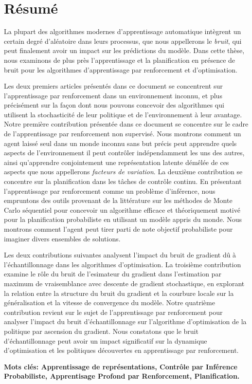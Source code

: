 \chapter*{R\'{e}sum\'{e}}
La plupart des algorithmes modernes d'apprentissage automatique intègrent un
certain degré d'aléatoire dans leurs processus, que nous appellerons le
\emph{bruit}, qui peut finalement avoir un impact sur les prédictions du modèle. Dans cette thèse, nous examinons de plus près l'apprentissage et la planification en présence de bruit pour les algorithmes d'apprentissage par renforcement et d'optimisation.

Les deux premiers articles présentés dans ce document se concentrent sur l'apprentissage par renforcement dans un environnement inconnu, et plus précisément sur la façon dont nous pouvons concevoir des algorithmes qui utilisent la stochasticité de leur politique et de l'environnement à leur avantage.
Notre première contribution présentée dans ce document se concentre sur le cadre
de l'apprentissage par renforcement non supervisé. Nous montrons comment un
agent laissé seul dans un monde inconnu sans but précis peut apprendre quels
aspects de l'environnement il peut contrôler indépendamment les uns des autres,
ainsi qu'apprendre conjointement une représentation latente démêlée de ces
aspects que nous appellerons \emph{facteurs de variation}.
La deuxième contribution se concentre sur la planification dans les tâches de
contrôle continu. En présentant l'apprentissage par renforcement comme un
problème d'inférence, nous empruntons des outils provenant de la littérature sur
les m\'{e}thodes de Monte Carlo séquentiel pour concevoir un algorithme efficace
et théoriquement motiv\'{e} pour la planification probabiliste en utilisant un
modèle appris du monde. Nous montrons comment l'agent peut tirer parti de note
objectif probabiliste pour imaginer divers ensembles de solutions.

Les deux contributions suivantes analysent l'impact du bruit de gradient dû à l'échantillonnage dans les algorithmes d'optimisation. 
La troisième contribution examine le rôle du bruit de l'esimateur du gradient dans l'estimation par maximum de vraisemblance avec descente de gradient stochastique, en explorant la relation entre la structure du bruit du gradient et la courbure locale sur la généralisation et la vitesse de convergence du modèle. 
Notre quatrième contribution revient sur le sujet de l'apprentissage par
renforcement pour analyser l'impact du bruit d'échantillonnage sur l'algorithme
d'optimisation de la politique par ascension du gradient. Nous constatons que le
bruit d'échantillonnage peut avoir un impact significatif sur la dynamique
d'optimisation et les politiques découvertes en apprentissage par
renforcement.


  {\bfseries Mots cl\'{e}s\hspace{-3pt}: Apprentissage de repr\'{e}sentations, Contr\^{o}le par Inf\'{e}rence Probabiliste, Apprentisage Profond par Renforcement, Planification.}
                                                                                                                                                            
